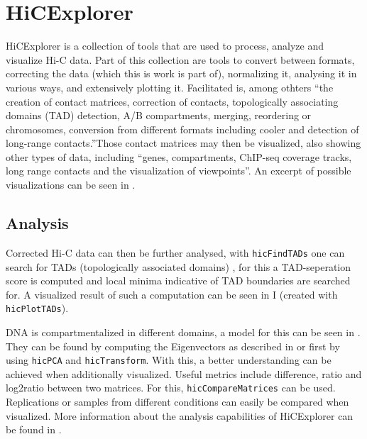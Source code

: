 \section{HiCExplorer}\label{sec:hicexplorer}



HiCExplorer \cite{wolff2018galaxy} is a collection of tools that are used to
process, analyze and visualize Hi-C data. Part of this collection are tools to
convert between formats, correcting the data (which this is work is part of),
normalizing it, analysing it in various ways, and extensively plotting it.
Facilitated is, among othters ``the creation of contact matrices, correction of
contacts, topologically associating domains (TAD) detection, A/B compartments,
merging, reordering or chromosomes, conversion from different formats including
cooler and detection of long-range contacts.''\footnotemark Those contact
matrices may then be visualized, also showing other types of data, including
``genes, compartments, ChIP-seq coverage tracks, long range contacts and the
visualization of viewpoints''\footnotemark[\value{footnote}]. An excerpt of
possible visualizations can be seen in .



\subsection{Analysis}\label{sec:analysis}



Corrected Hi-C data can then be further analysed, with \verb|hicFindTADs| one
can search for TADs (topologically associated domains) \cite{ramirez2018high},
for this a TAD-seperation score is computed and local minima indicative of TAD
boundaries are searched for. A visualized result of such a computation can be
seen in I (created with \verb|hicPlotTADs|).

DNA is compartmentalized \cite{lieberman2009comprehensive} in different
domains, a model for this can be seen in . They
can be found by computing the Eigenvectors as described in
\cite{lieberman2009comprehensive} or \cite{imakaev2012iterative} first by using
\verb|hicPCA| and \verb|hicTransform|. With this, a better understanding can be
achieved when additionally visualized. Useful metrics include difference, ratio
and log2ratio between two matrices. For this, \verb|hicCompareMatrices| can be
used.  Replications or samples from different conditions can easily be compared
when visualized. More information about the analysis capabilities of
HiCExplorer can be found in \cite{wolff2018galaxy}.

